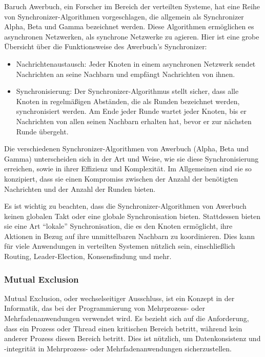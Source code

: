 Baruch Awerbuch, ein Forscher im Bereich der verteilten Systeme, hat eine Reihe von Synchronizer-Algorithmen vorgeschlagen, die allgemein als Synchronizer Alpha, Beta und Gamma bezeichnet werden. Diese Algorithmen ermöglichen es asynchronen Netzwerken, als synchrone Netzwerke zu agieren.
Hier ist eine grobe Übersicht über die Funktionsweise des Awerbuch's Synchronizer:
\begin{itemize}
\item Nachrichtenaustausch: Jeder Knoten in einem asynchronen Netzwerk sendet Nachrichten an seine Nachbarn und empfängt Nachrichten von ihnen.
\item Synchronisierung: Der Synchronizer-Algorithmus stellt sicher, dass alle Knoten in regelmäßigen Abständen, die als Runden bezeichnet werden, synchronisiert werden. Am Ende jeder Runde wartet jeder Knoten, bis er Nachrichten von allen seinen Nachbarn erhalten hat, bevor er zur nächsten Runde übergeht.
\end{itemize}    
Die verschiedenen Synchronizer-Algorithmen von Awerbuch (Alpha, Beta und Gamma) unterscheiden sich in der Art und Weise, wie sie diese Synchronisierung erreichen, sowie in ihrer Effizienz und Komplexität. Im Allgemeinen sind sie so konzipiert, dass sie einen Kompromiss zwischen der Anzahl der benötigten Nachrichten und der Anzahl der Runden bieten.

Es ist wichtig zu beachten, dass die Synchronizer-Algorithmen von Awerbuch keinen globalen Takt oder eine globale Synchronisation bieten. Stattdessen bieten sie eine Art \enquote{lokale} Synchronisation, die es den Knoten ermöglicht, ihre Aktionen in Bezug auf ihre unmittelbaren Nachbarn zu koordinieren. Dies kann für viele Anwendungen in verteilten Systemen nützlich sein, einschließlich Routing, Leader-Election, Konsensfindung und mehr.

\subsubsection{Mutual Exclusion}
Mutual Exclusion, oder wechselseitiger Ausschluss, ist ein Konzept in der Informatik, das bei der Programmierung von Mehrprozess- oder Mehrfadenanwendungen verwendet wird. Es bezieht sich auf die Anforderung, dass ein Prozess oder Thread einen kritischen Bereich betritt, während kein anderer Prozess diesen Bereich betritt. Dies ist nützlich, um Datenkonsistenz und -integrität in Mehrprozess- oder Mehrfadenanwendungen sicherzustellen.

